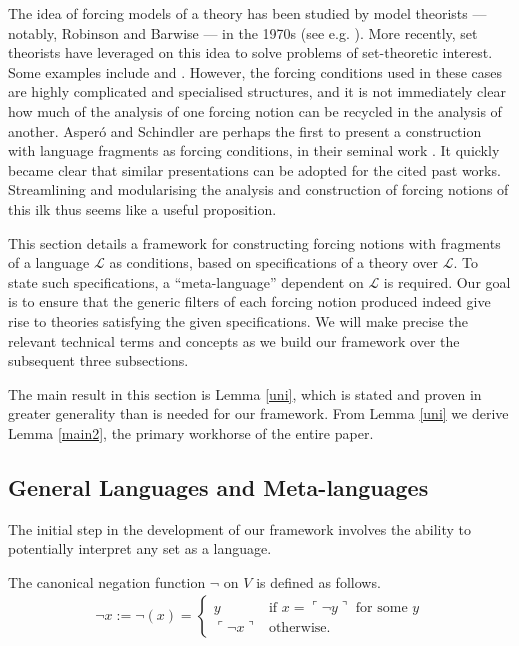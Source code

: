 \documentclass[12pt]{article}
\numberwithin{equation}{section}
\begin{document}
The idea of forcing models of a theory has been studied by model theorists --- notably, Robinson and Barwise --- in the 1970s (see e.g. \cite{keisler}). More recently, set theorists have leveraged on this idea to solve problems of set-theoretic interest. Some examples include \cite{doebler} and \cite{lforcing}. However, the forcing conditions used in these cases are highly complicated and specialised structures, and it is not immediately clear how much of the analysis of one forcing notion can be recycled in the analysis of another. Asper\'{o} and Schindler are perhaps the first to present a construction with language fragments as forcing conditions, in their seminal work \cite{schindler}. It quickly became clear that similar presentations can be adopted for the cited past works. Streamlining and modularising the analysis and construction of forcing notions of this ilk thus seems like a useful proposition.

This section details a framework for constructing forcing notions with fragments of a language $\mathcal{L}$ as conditions, based on specifications of a theory over $\mathcal{L}$. To state such specifications, a ``meta-language'' dependent on $\mathcal{L}$ is required. Our goal is to ensure that the generic filters of each forcing notion produced indeed give rise to theories satisfying the given specifications. We will make precise the relevant technical terms and concepts as we build our framework over the subsequent three subsections. 

The main result in this section is Lemma \ref{uni}, which is stated and proven in greater generality than is needed for our framework. From Lemma \ref{uni} we derive Lemma \ref{main2}, the primary workhorse of the entire paper.

\subsection{General Languages and Meta-languages}

The initial step in the development of our framework involves the ability to potentially interpret any set as a language. 

\begin{defi}\label{neg}
The canonical negation function $\neg$ on $V$ is defined as follows. 
\begin{align*}
    \neg x := \neg(x) = 
    \begin{cases}
        y & \text{if } x = \ulcorner \neg y \urcorner \text{ for some } y \\
        \ulcorner \neg x \urcorner & \text{otherwise}.
    \end{cases}
\end{align*}
\end{defi}
\end{document}
